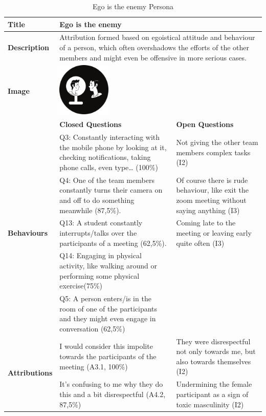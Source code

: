\begin{longtable}[ht]{ p{}  p{} p{} }
\caption{Ego is the enemy Persona}
\label{tab:theEgo}\\
\hline
\textbf{Title} & Ego is the enemy \\
    \hline
   \textbf{Description} & \multicolumn{2}{p{.80\textwidth}}{Attribution formed based on egoistical attitude and behaviour of a person, which often overshadows the efforts of the other members and might even be offensive in more serious cases.}  \\
   \hline
   \textbf{Image} &  \includegraphics[valign=t, width=1in, margin=0pt 3pt 0pt 3pt]{figures/Ego.png} \\
    \hline
    & \textbf{Closed Questions} & \textbf{Open Questions} \\
    \hline
    \multirow{5}{3cm}{\textbf{Behaviours}}  & Q3: Constantly interacting with the mobile phone by looking at it, checking notifications, taking phone calls, even type… (100\%) & Not giving the other team members complex tasks (I2) \\
     &  Q4: One of the team members constantly turns their camera on and off to do something meanwhile (87,5\%). & Of course there is rude behaviour, like exit the zoom meeting without saying anything (I3) \\
     & Q13: A student constantly interrupts/talks over the participants of a meeting (62,5\%). &  Coming late to the meeting or leaving early quite often (I3) \\
 	 & Q14: Engaging in physical activity, like walking around or performing some physical exercise(75\%)  \\
 	 & Q5: A person enters/is in the room of one of the participants and they might even engage in conversation (62,5\%) \\
 	\hline
    \multirow{6}{3cm}{\textbf{Attributions}}  & I would consider this impolite towards the participants of the meeting (A3.1, 100\%) & They were disrespectful not only towards me, but also towards themselves (I2) \\
     & It’s confusing to me why they do this and a bit disrespectful (A4.2, 87,5\%)&  Undermining the female participant as a sign of toxic masculinity (I2) \\

\end{longtable}
